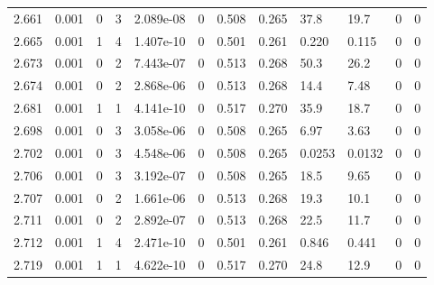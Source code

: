 \documentclass[preview]{standalone}
\begin{document}
{{{{{{\begin{tabular}{L{1.2cm}C{1.2cm} C{0.3cm}C{0.5cm} C{1.4cm}C{1.4cm} C{1.4cm}C{1.4cm} C{1.6cm}C{1.6cm} C{1.6cm}C{1.6cm}}
  2.661  &  0.001  & 0     &  3 &  2.089e-08  & 0  &  0.508&   0.265& 37.8 & 19.7   &  0 & 0  \\ 
  2.665  &  0.001  & 1     &  4 &  1.407e-10  & 0  &  0.501&   0.261& 0.220 & 0.115   &  0 & 0  \\ 
  2.673  &  0.001  & 0     &  2 &  7.443e-07  & 0  &  0.513&   0.268& 50.3 & 26.2   &  0 & 0  \\ 
  2.674  &  0.001  & 0     &  2 &  2.868e-06  & 0  &  0.513&   0.268& 14.4 & 7.48   &  0 & 0  \\ 
  2.681  &  0.001  & 1     &  1 &  4.141e-10  & 0  &  0.517&   0.270& 35.9 & 18.7   &  0 & 0  \\ 
  2.698  &  0.001  & 0     &  3 &  3.058e-06  & 0  &  0.508&   0.265& 6.97 & 3.63   &  0 & 0  \\ 
  2.702  &  0.001  & 0     &  3 &  4.548e-06  & 0  &  0.508&   0.265& 0.0253 & 0.0132   &  0 & 0  \\ 
  2.706  &  0.001  & 0     &  3 &  3.192e-07  & 0  &  0.508&   0.265& 18.5 & 9.65   &  0 & 0  \\ 
  2.707  &  0.001  & 0     &  2 &  1.661e-06  & 0  &  0.513&   0.268& 19.3 & 10.1   &  0 & 0  \\ 
  2.711  &  0.001  & 0     &  2 &  2.892e-07  & 0  &  0.513&   0.268& 22.5 & 11.7   &  0 & 0  \\ 
  2.712  &  0.001  & 1     &  4 &  2.471e-10  & 0  &  0.501&   0.261& 0.846 & 0.441   &  0 & 0  \\ 
  2.719  &  0.001  & 1     &  1 &  4.622e-10  & 0  &  0.517&   0.270& 24.8 & 12.9   &  0 & 0  \\ 
\hline 
\end{tabular} 

}}}}}}
\end{document}

